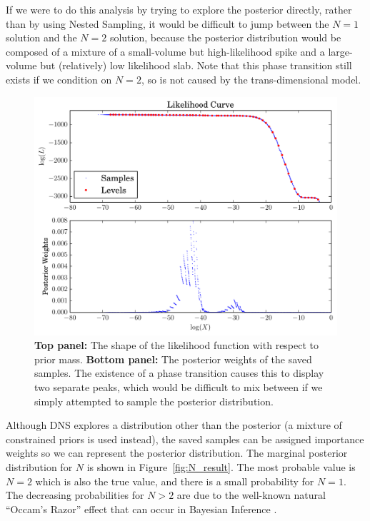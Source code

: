\documentclass[letterpaper, 11pt]{article}
\begin{document}
If we were to do this analysis by trying to explore the posterior directly,
rather than by using Nested Sampling, it would be difficult to jump between
the $N=1$ solution and the $N=2$ solution, because the posterior distribution
would be composed of a mixture of a small-volume but high-likelihood spike
and a large-volume but (relatively) low likelihood
slab. Note that this phase transition still exists if we condition on $N=2$,
so is not caused by the trans-dimensional model.


\begin{figure}
\begin{center}
\includegraphics[scale=0.5]{sinewaves_likelihood.pdf}
\caption{{\bf Top panel: }
The shape of the likelihood function with respect to prior mass.
{\bf Bottom panel: }The posterior weights of the saved samples. The existence
of a phase transition causes this to display two separate peaks, which
would be difficult to mix between if we simply attempted to sample the posterior
distribution.
\label{fig:sinewaves_likelihood}}
\end{center}
\end{figure}

Although DNS explores a distribution other than the posterior (a mixture of
constrained priors is used instead), the saved samples can be assigned
importance weights so we can represent the posterior distribution. The
marginal posterior distribution for $N$ is shown in Figure~\ref{fig:N_result}.
The most probable value is $N=2$ which is also the true value, and there is
a small probability for $N=1$. The decreasing probabilities for $N > 2$ are
due to the well-known natural ``Occam's Razor'' effect that can occur in
Bayesian Inference \citep[e.g.][Chapter 28]{mackay}.
\end{document}
